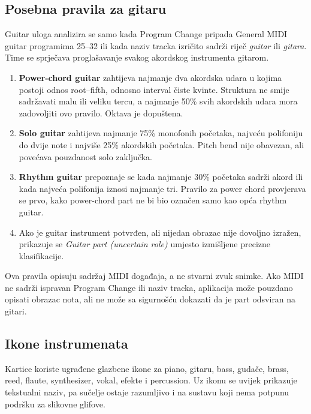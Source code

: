 \documentclass[11pt]{article}
\begin{document}
\subsection{Posebna pravila za gitaru}

Guitar uloga analizira se samo kada Program Change pripada General MIDI guitar
programima 25--32 ili kada naziv tracka izričito sadrži riječ \emph{guitar} ili
\emph{gitara}. Time se sprječava proglašavanje svakog akordskog instrumenta
gitarom.

\begin{enumerate}[label=G\arabic*.]
    \item \textbf{Power-chord guitar} zahtijeva najmanje dva akordska udara u
    kojima postoji odnos root--fifth, odnosno interval čiste kvinte. Struktura
    ne smije sadržavati malu ili veliku tercu, a najmanje 50\% svih akordskih
    udara mora zadovoljiti ovo pravilo. Oktava je dopuštena.

    \item \textbf{Solo guitar} zahtijeva najmanje 75\% monofonih početaka,
    najveću polifoniju do dvije note i najviše 25\% akordskih početaka. Pitch
    bend nije obavezan, ali povećava pouzdanost solo zaključka.

    \item \textbf{Rhythm guitar} prepoznaje se kada najmanje 30\% početaka
    sadrži akord ili kada najveća polifonija iznosi najmanje tri. Pravilo za
    power chord provjerava se prvo, kako power-chord part ne bi bio označen samo
    kao opća rhythm guitar.

    \item Ako je guitar instrument potvrđen, ali nijedan obrazac nije dovoljno
    izražen, prikazuje se \emph{Guitar part (uncertain role)} umjesto izmišljene
    precizne klasifikacije.
\end{enumerate}

Ova pravila opisuju sadržaj MIDI događaja, a ne stvarni zvuk snimke. Ako MIDI
ne sadrži ispravan Program Change ili naziv tracka, aplikacija može pouzdano
opisati obrazac nota, ali ne može sa sigurnošću dokazati da je part odsviran na
gitari.

\subsection{Ikone instrumenata}

Kartice koriste ugrađene glazbene ikone za piano, gitaru, bass, gudače, brass,
reed, flaute, synthesizer, vokal, efekte i percussion. Uz ikonu se uvijek
prikazuje tekstualni naziv, pa sučelje ostaje razumljivo i na sustavu koji nema
potpunu podršku za slikovne glifove.
\end{document}
